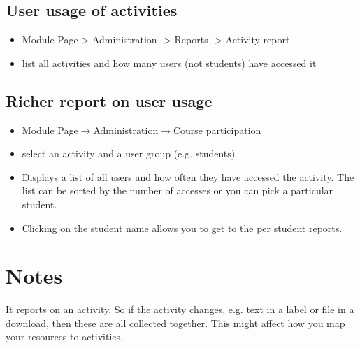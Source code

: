 \documentclass{lucs-art}
\begin{document}
\subsection{User usage of activities}\label{user-usage-of-activities}

\begin{itemize}
\item
  Module Page-\textgreater{} Administration -\textgreater{} Reports
  -\textgreater{} Activity report
\item
  list all activities and how many users (not students) have accessed it
\end{itemize}

\subsection{Richer report on user
usage}\label{richer-report-on-user-usage}

\begin{itemize}
\item
  Module Page$\rightarrow$Administration$\rightarrow$Course
  participation
\item
  select an activity and a user group (e.g. students)
\item
  Displays a list of all users and how often they have accessed the
  activity. The list can be sorted by the number of accesses or you can
  pick a particular student.
\item
  Clicking on the student name allows you to get to the per student
  reports.
\end{itemize}

\section{Notes}\label{notes}

It reports on an activity. So if the activity changes, e.g. text in a
label or file in a download, then these are all collected together. This
might affect how you map your resources to activities.
\end{document}

